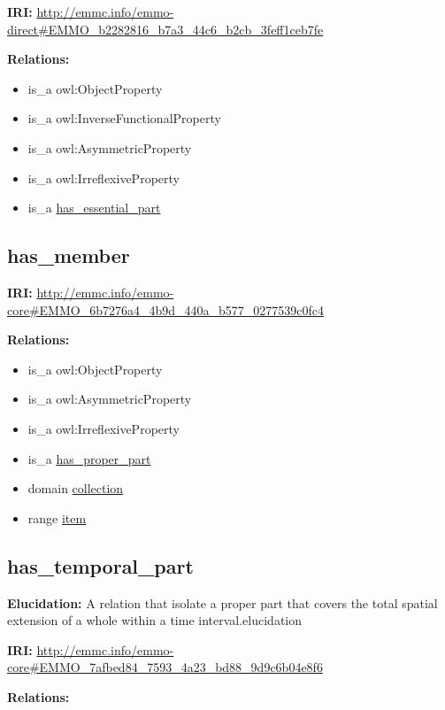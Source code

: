 \documentclass[a4paper,]{report}
\providecommand{\tightlist}{%
  \setlength{\itemsep}{0pt}\setlength{\parskip}{0pt}}
\begin{document}
\textbf{IRI:}
\url{http://emmc.info/emmo-direct\#EMMO_b2282816_b7a3_44c6_b2cb_3feff1ceb7fe}

\textbf{Relations:}

\begin{itemize}
\tightlist
\item
  is\_a owl:ObjectProperty
\item
  is\_a owl:InverseFunctionalProperty
\item
  is\_a owl:AsymmetricProperty
\item
  is\_a owl:IrreflexiveProperty
\item
  is\_a \protect\hyperlink{has_essential_part}{has\_essential\_part}
\end{itemize}

\hypertarget{has_member}{%
\subsection{has\_member}\label{has_member}}

\textbf{IRI:}
\url{http://emmc.info/emmo-core\#EMMO_6b7276a4_4b9d_440a_b577_0277539c0fc4}

\textbf{Relations:}

\begin{itemize}
\tightlist
\item
  is\_a owl:ObjectProperty
\item
  is\_a owl:AsymmetricProperty
\item
  is\_a owl:IrreflexiveProperty
\item
  is\_a \protect\hyperlink{has_proper_part}{has\_proper\_part}
\item
  domain \protect\hyperlink{collection}{collection}
\item
  range \protect\hyperlink{item}{item}
\end{itemize}

\hypertarget{has_temporal_part}{%
\subsection{has\_temporal\_part}\label{has_temporal_part}}

\textbf{Elucidation:} A relation that isolate a proper part that covers
the total spatial extension of a whole within a time
interval.elucidation

\textbf{IRI:}
\url{http://emmc.info/emmo-core\#EMMO_7afbed84_7593_4a23_bd88_9d9c6b04e8f6}

\textbf{Relations:}
\end{document}

